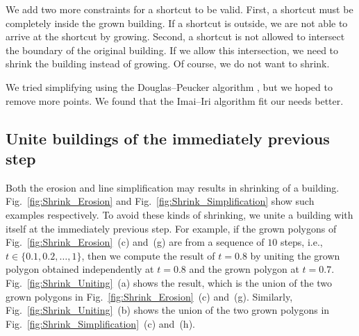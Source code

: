 \documentclass[graybox]{svmult}
\newcommand{\fig}{Fig.~}
\begin{document}
We add two more constraints for a shortcut to be valid. 
First, a shortcut must be completely inside the grown building.
If a shortcut is outside,
we are not able to arrive at the shortcut by growing.
Second, a shortcut is not allowed to intersect the 
boundary of the original building.
If we allow this intersection, 
we need to shrink the building instead of growing. 
Of course, we do not want to shrink.

We tried simplifying using 
the Douglas--Peucker algorithm \parencite{Douglas1973}, 
but we hoped to remove more points. 
We found that the Imai--Iri 
algorithm fit our needs better. 



\subsection{Unite buildings of the immediately previous step}
\label{sec:Unite}

Both the erosion and line simplification may results in shrinking of a building.
\fig\ref{fig:Shrink_Erosion} and \fig\ref{fig:Shrink_Simplification} show such 
examples respectively.
To avoid these kinds of shrinking,
we unite a building with itself at the immediately previous step.
For example, if the grown polygons of 
\fig\ref{fig:Shrink_Erosion}~(c) and~(g) 
are from a sequence of $10$ steps, 
i.e., $t \in \{0.1, 0.2, \dots, 1\}$, 
then we compute the result of $t=0.8$ by uniting 
the grown polygon obtained independently at $t=0.8$ and 
the grown polygon at $t=0.7$. 
\fig\ref{fig:Shrink_Uniting}~(a) shows the result,
which is the union of the two grown polygons in 
\fig\ref{fig:Shrink_Erosion}~(c) and~(g).
Similarly, \fig\ref{fig:Shrink_Uniting}~(b) shows the union of the two grown 
polygons in 
\fig\ref{fig:Shrink_Simplification}~(c) and~(h).
\end{document}
